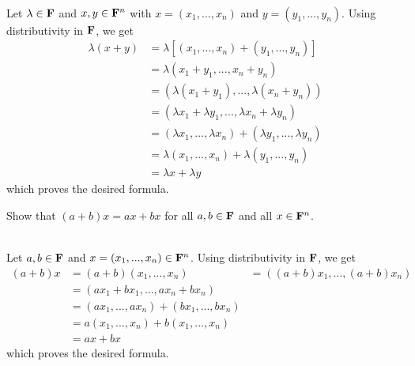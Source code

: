 \begin{solution}
    \\ Let $\lambda \in \mathbf{F}$ and $x,y \in \mathbf{F}^n$ with $x = (x_1, ..., x_n)$ and $y = (y_1, ..., y_n)$. Using distributivity in $\mathbf{F}$, we get
    \begin{align*}
        \lambda(x + y) &= \lambda [(x_1, ..., x_n) + (y_1, ..., y_n)] \\
        &= \lambda(x_1 + y_1, ..., x_n + y_n) \\
        &= (\lambda(x_1 + y_1), ..., \lambda (x_n + y_n))\\
        &= (\lambda x_1 + \lambda y_1, ..., \lambda x_n + \lambda y_n) \\
        &= (\lambda x_1, ..., \lambda x_n) + (\lambda y_1, ..., \lambda y_n) \\
        &= \lambda (x_1, ..., x_n) + \lambda (y_1, ...,y_n) \\
        &= \lambda x + \lambda y
    \end{align*}
    which proves the desired formula.\\
\end{solution}

\begin{exercise}
    Show that $(a + b)x = ax + bx$ for all $a,b \in \mathbf{F}$ and all $x \in \mathbf{F}^n$. \\
\end{exercise}

\begin{solution}
    \\ Let $a,b \in \mathbf{F}$ and $x = (x_1, ..., x_n) \in \mathbf{F}^n$. Using distributivity in $\mathbf{F}$, we get
    \begin{align*}
        (a+b)x &= (a+b)(x_1, ..., x_n) &= ((a+b)x_1, ..., (a+b)x_n) \\
        &= (ax_1 + bx_1, ..., ax_n + bx_n) \\
        &= (ax_1, ..., ax_n) + (bx_1, ..., bx_n) \\
        &= a(x_1, ..., x_n) + b(x_1, ..., x_n) \\
        &= ax + bx
    \end{align*}
    which proves the desired formula.
\end{solution}